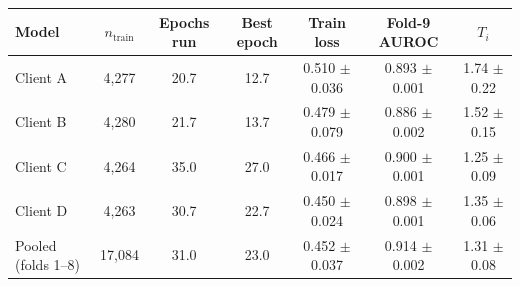 \begin{tabular}{@{}lcccccc@{}}
\toprule
Model & $n_{\text{train}}$ & Epochs run & Best epoch & Train loss & Fold-9 AUROC & $T_i$ \\
\midrule
Client A & 4{,}277 & 20.7 & 12.7 & 0.510 $\pm$ 0.036 & 0.893 $\pm$ 0.001 & 1.74 $\pm$ 0.22 \\
Client B & 4{,}280 & 21.7 & 13.7 & 0.479 $\pm$ 0.079 & 0.886 $\pm$ 0.002 & 1.52 $\pm$ 0.15 \\
Client C & 4{,}264 & 35.0 & 27.0 & 0.466 $\pm$ 0.017 & 0.900 $\pm$ 0.001 & 1.25 $\pm$ 0.09 \\
Client D & 4{,}263 & 30.7 & 22.7 & 0.450 $\pm$ 0.024 & 0.898 $\pm$ 0.001 & 1.35 $\pm$ 0.06 \\
Pooled (folds 1--8) & 17{,}084 & 31.0 & 23.0 & 0.452 $\pm$ 0.037 & 0.914 $\pm$ 0.002 & 1.31 $\pm$ 0.08 \\
\bottomrule
\end{tabular}
